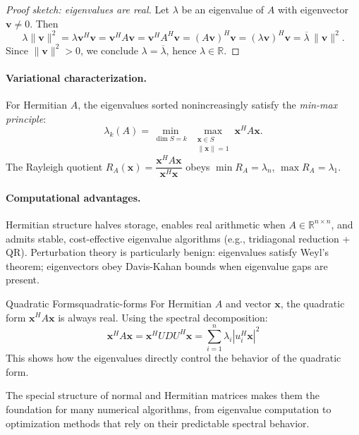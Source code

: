 \begin{proof}[Proof sketch: eigenvalues are real]
    Let $\lambda$ be an eigenvalue of $A$ with eigenvector $\mathbf{v} \neq 0$. Then
    \[
        \lambda \|\mathbf{v}\|^2
        = \lambda \mathbf{v}^H \mathbf{v}
        = \mathbf{v}^H A \mathbf{v}
        = \mathbf{v}^H A^H \mathbf{v}
        = (A\mathbf{v})^H \mathbf{v}
        = (\lambda \mathbf{v})^H \mathbf{v}
        = \overline{\lambda}\, \|\mathbf{v}\|^2.
    \]
    Since $\|\mathbf{v}\|^2 > 0$, we conclude $\lambda = \overline{\lambda}$, hence $\lambda \in \mathbb{R}$.
\end{proof}

\paragraph{Variational characterization.}
For Hermitian $A$, the eigenvalues sorted nonincreasingly satisfy the \emph{min-max principle}:
\[
    \lambda_k(A)=\min_{\dim S=k}\ \max_{\substack{\mathbf{x}\in S\\ \|\mathbf{x}\|=1}} \mathbf{x}^H A \mathbf{x}.
\]
The Rayleigh quotient $R_A(\mathbf{x})=\dfrac{\mathbf{x}^H A \mathbf{x}}{\mathbf{x}^H \mathbf{x}}$ obeys $\min R_A=\lambda_n$, $\max R_A=\lambda_1$.

\paragraph{Computational advantages.}
Hermitian structure halves storage, enables real arithmetic when $A\in\mathbb{R}^{n\times n}$, and admits stable, cost-effective eigenvalue algorithms (e.g., tridiagonal reduction + QR). Perturbation theory is particularly benign: eigenvalues satisfy Weyl's theorem; eigenvectors obey Davis-Kahan bounds when eigenvalue gaps are present.

\begin{example}{Quadratic Forms}{quadratic-forms}
    For Hermitian $A$ and vector $\mathbf{x}$, the quadratic form $\mathbf{x}^H A \mathbf{x}$ is always real. Using the spectral decomposition:
    \[
        \mathbf{x}^H A \mathbf{x} = \mathbf{x}^H U D U^H \mathbf{x} = \sum_{i=1}^n \lambda_i |u_i^H \mathbf{x}|^2
    \]
    This shows how the eigenvalues directly control the behavior of the quadratic form.
\end{example}

The special structure of normal and Hermitian matrices makes them the foundation for many numerical algorithms, from eigenvalue computation to optimization methods that rely on their predictable spectral behavior.

